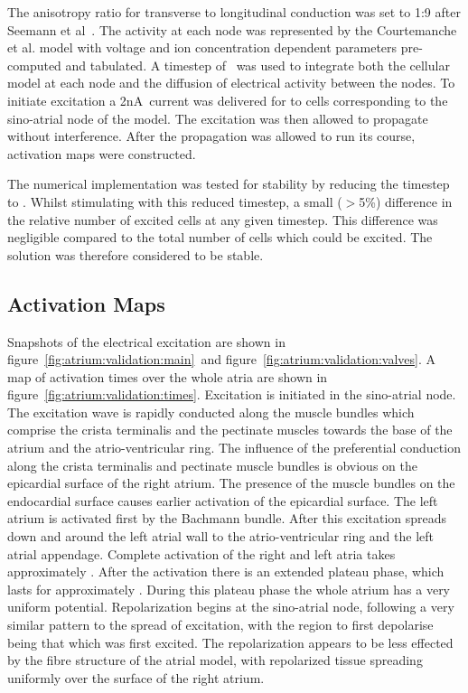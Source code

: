 The anisotropy ratio for transverse to longitudinal conduction was set to 1:9
after Seemann et al~\cite{Seemann2006}.
The activity at each node was represented by the Courtemanche et al. model with
voltage and ion concentration dependent parameters pre-computed and tabulated.
A timestep of \ was used to integrate both the cellular model at each
node and the diffusion of electrical activity between the nodes.
To initiate excitation a \unit{2}{nA}\ current was delivered for  to cells
corresponding to the sino-atrial node of the model.
The excitation was then allowed to propagate without interference.
After the propagation was allowed to run its course, activation maps were
constructed.

The numerical implementation was tested for stability by reducing the timestep
to .
Whilst stimulating with this reduced timestep, a small ($>$5\%) difference in the relative number
of excited cells at any given timestep.
This difference was negligible compared to the total number of cells which could
be excited.
The solution was therefore considered to be stable.

\subsection{Activation Maps}

Snapshots of the electrical excitation are shown in
figure~\ref{fig:atrium:validation:main}\ and figure~\ref{fig:atrium:validation:valves}.
A map of activation times over the whole atria are shown in
figure~\ref{fig:atrium:validation:times}.
Excitation is initiated in the sino-atrial node.
The excitation wave is rapidly conducted along the muscle bundles which comprise
the crista terminalis and the pectinate muscles towards the base of the atrium
and the atrio-ventricular ring.
The influence of the preferential conduction along the crista terminalis and
pectinate muscle bundles is obvious on the epicardial surface of the right
atrium.
The presence of the muscle bundles on the endocardial surface causes earlier
activation of the epicardial surface.
The left atrium is activated first by the Bachmann bundle.
After this excitation spreads down and around the left atrial wall to the
atrio-ventricular ring and the left atrial appendage.
Complete activation of the right and left atria takes approximately .
After the activation there is an extended plateau phase, which lasts for
approximately .
During this plateau phase the whole atrium has a very uniform potential.
Repolarization begins at the sino-atrial node, following a very similar pattern
to the spread of excitation, with the region to first depolarise being that
which was first excited.
The repolarization appears to be less effected by the fibre structure of the
atrial model, with repolarized tissue spreading uniformly over the surface of
the right atrium.

